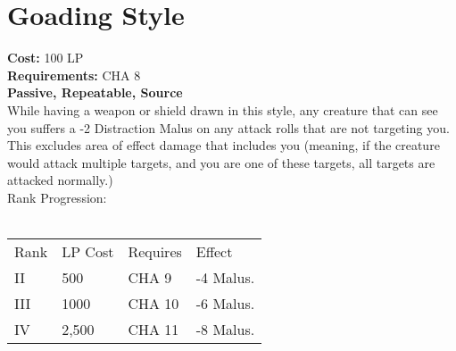 \section{Goading Style}\label{perk:goadingStyle}
\textbf{Cost:} 100 LP\\
\textbf{Requirements:} CHA 8\\
\textbf{Passive, Repeatable, Source}\\
While having a weapon or shield drawn in this style, any creature that can see you suffers a -2 Distraction Malus on any attack rolls that are not targeting you.
This excludes area of effect damage that includes you (meaning, if the creature would attack multiple targets, and you are one of these targets, all targets are attacked normally.)\\

Rank Progression:\\
\\
\begin{tabular}{l | l | l | l}
    Rank & LP Cost & Requires & Effect\\
    II & 500 & CHA 9 & -4 Malus.\\
    III & 1000 & CHA 10 & -6 Malus.\\
    IV & 2,500 & CHA 11 & -8 Malus.\\
\end{tabular}